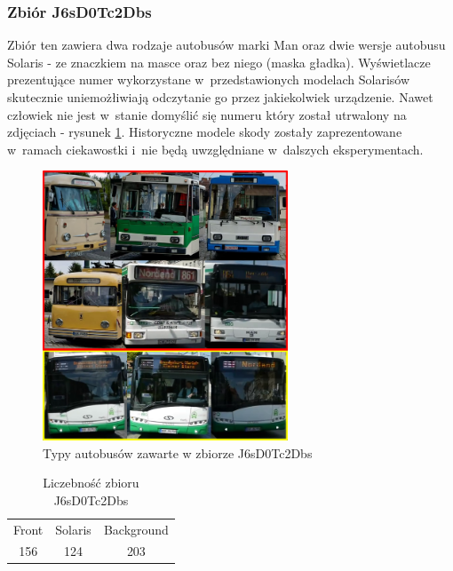 \newpage

\subsubsection{Zbiór J6sD0Tc2Dbs}

Zbiór ten zawiera dwa rodzaje autobusów marki Man oraz dwie wersje autobusu
Solaris - ze znaczkiem na masce oraz bez niego (maska gładka). Wyświetlacze
prezentujące numer wykorzystane w~przedstawionych modelach Solarisów
skutecznie uniemożłiwiają odczytanie go przez jakiekolwiek urządzenie. 
Nawet człowiek nie jest w~stanie domyślić się numeru który został utrwalony
na zdjęciach - rysunek \ref{fig:J6sD0Tc2Dbs_types}. Historyczne modele
skody zostały zaprezentowane w~ramach ciekawostki i~nie będą uwzględniane
w~dalszych eksperymentach.

\begin{figure}[!h]
    \centering
    \includegraphics[width=0.65\textwidth]{img/exp_trainig_data_J6s}
    \caption{Typy autobusów zawarte w zbiorze J6sD0Tc2Dbs}
    \label{fig:J6sD0Tc2Dbs_types}
\end{figure}

\begin{table}[!h]
    \centering
    \begin{tabular}{c|c|c}
        Front   & Solaris   & Background \\
        156     & 124       & 203 
    \end{tabular}
    \caption{Liczebność zbioru J6sD0Tc2Dbs}
    \label{tab:J6sD0Tc2Dbs_count}
\end{table}

\newpage

